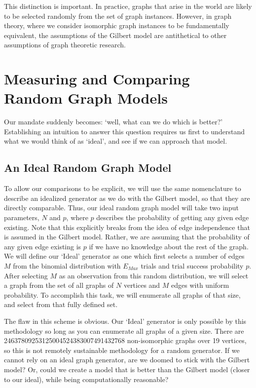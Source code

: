 This distinction is important.
In practice, graphs that arise in the world are likely to be selected randomly from the set of graph instances.
However, in graph theory, where we consider isomorphic graph instances to be fundamentally equivalent, the assumptions of the Gilbert model are antithetical to other assumptions of graph theoretic research.

\section{Measuring and Comparing Random Graph Models}

Our mandate suddenly becomes: `well, what can we do which is better?'
Establishing an intuition to answer this question requires us first to understand what we would think of as `ideal', and see if we can approach that model.

\subsection{An Ideal Random Graph Model}
To allow our comparisons to be explicit, we will use the same nomenclature to describe an idealized generator as we do with the Gilbert model, so that they are directly comparable.
Thus, our ideal random graph model will take two input parameters, $N$ and $p$, where $p$ describes the probability of getting any given edge existing.
Note that this explicitly breaks from the idea of edge independence that is assumed in the Gilbert model.
Rather, we are assuming that the probability of any given edge existing is $p$ if we have no knowledge about the rest of the graph.
We will define our `Ideal' generator as one which first selects a number of edges $M$ from the binomial distribution with $E_{Max}$ trials and trial success probability $p$.
After selecting $M$ as an observation from this random distribution, we will select a graph from the set of all graphs of $N$ vertices and $M$ edges with uniform probability.
To accomplish this task, we will enumerate all graphs of that size, and select from that fully defined set.

The flaw in this scheme is obvious.
Our `Ideal' generator is only possible by this methodology so long as you can enumerate all graphs of a given size.
There are 24637809253125004524383007491432768 non-isomorphic graphs over 19 vertices, so this is not remotely sustainable methodology for a random generator.
If we cannot rely on an ideal graph generator, are we doomed to stick with the Gilbert model?
Or, could we create a model that is better than the Gilbert model (closer to our ideal), while being computationally reasonable?

